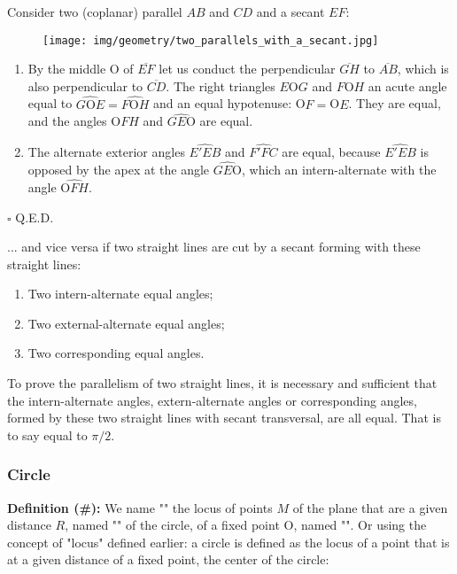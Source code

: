 	\begin{dem}
	Consider two (coplanar) parallel $AB$ and $CD$ and a secant $EF$:
	\begin{figure}[H]
		\centering
		\texttt{[image: img/geometry/two\_parallels\_with\_a\_secant.jpg]}
	\end{figure}
	\begin{enumerate}
		\item By the middle O of $\overline{EF}$ let us conduct the perpendicular $\overline{GH}$ to $\overline{AB}$, which is also perpendicular to $\overline{CD}$. The right triangles $E$O$G$ and $F$O$H$ an acute angle equal to $\widehat{G\text{O}E}=\widehat{F\text{O}H}$ and an equal hypotenuse: O$F = $O$E$. They are equal, and the angles $\widehat{\text{O}FH}$ and $\widehat{GE\text{O}}$ are equal.

		\item The alternate exterior angles $\widehat{E'EB}$ and $\widehat{F'FC}$ are equal, because $\widehat{E'EB}$ is opposed by the apex at the angle $\widehat{GE\text{O}}$, which an intern-alternate with the angle $\widehat{\text{O}FH}$.
	\end{enumerate}
	\begin{flushright}
		$\square$  Q.E.D.
	\end{flushright}
	\end{dem}
	... and vice versa if two straight lines are cut by a secant forming with these straight lines:
	\begin{enumerate}
		\item Two intern-alternate equal angles;
		\item Two external-alternate equal angles;
		\item Two corresponding equal angles.
	\end{enumerate} 
	\begin{tcolorbox}[title=Remark,colframe=black,arc=10pt]
	To prove the parallelism of two straight lines, it is necessary and sufficient that the intern-alternate angles, extern-alternate angles or corresponding angles, formed by these two straight lines with secant transversal, are all equal. That is to say equal to $\pi/2$.
	\end{tcolorbox}
	
	\pagebreak
	\subsubsection{Circle}\label{circle}
	\textbf{Definition (\#\mydef):} We name "" the locus of points $M$ of the plane that are a given distance $R$, named "" of the circle, of a fixed point O, named "". Or using the concept of "locus" defined earlier:  a circle is defined as the locus of a point that is at a given distance of a fixed point, the center of the circle:
	
